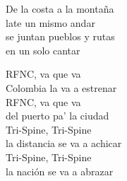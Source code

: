 \begin{lyrics}
De la costa a la montaña\\
late un mismo andar\\
se juntan pueblos y rutas\\
en un solo cantar

RFNC, va que va\\
Colombia la va a estrenar\\
RFNC, va que va\\
del puerto pa’ la ciudad\\
Tri-Spine, Tri-Spine\\
la distancia se va a achicar\\
Tri-Spine, Tri-Spine\\
la nación se va a abrazar
\end{lyrics}

